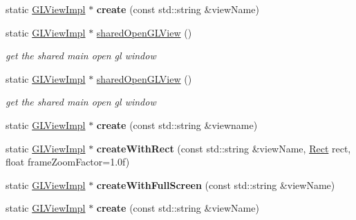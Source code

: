 \begin{DoxyCompactItemize}
static \hyperlink{classGLViewImpl}{G\+L\+View\+Impl} $\ast$ {\bfseries create} (const std\+::string \&view\+Name)
\item 
\mbox{\label{classGLViewImpl_aeb7c469b5f69781f95939b463eb1a0a3}} 
static \hyperlink{classGLViewImpl}{G\+L\+View\+Impl} $\ast$ \hyperlink{classGLViewImpl_aeb7c469b5f69781f95939b463eb1a0a3}{shared\+Open\+G\+L\+View} ()
\begin{DoxyCompactList}\small\item\em get the shared main open gl window \end{DoxyCompactList}\item 
\mbox{\label{classGLViewImpl_ad1848aec8bd128fe100241199df65e3d}} 
static \hyperlink{classGLViewImpl}{G\+L\+View\+Impl} $\ast$ \hyperlink{classGLViewImpl_ad1848aec8bd128fe100241199df65e3d}{shared\+Open\+G\+L\+View} ()
\begin{DoxyCompactList}\small\item\em get the shared main open gl window \end{DoxyCompactList}\item 
\mbox{\label{classGLViewImpl_aec0a6a65ba1e2eccc4151d949c9e4157}} 
static \hyperlink{classGLViewImpl}{G\+L\+View\+Impl} $\ast$ {\bfseries create} (const std\+::string \&viewname)
\item 
\mbox{\label{classGLViewImpl_a4698aaca4ca46c308859c7b731bf5cc1}} 
static \hyperlink{classGLViewImpl}{G\+L\+View\+Impl} $\ast$ {\bfseries create\+With\+Rect} (const std\+::string \&view\+Name, \hyperlink{classRect}{Rect} rect, float frame\+Zoom\+Factor=1.\+0f)
\item 
\mbox{\label{classGLViewImpl_aca84dd242aa41c37bb47a196c2a8870b}} 
static \hyperlink{classGLViewImpl}{G\+L\+View\+Impl} $\ast$ {\bfseries create\+With\+Full\+Screen} (const std\+::string \&view\+Name)
\item 
\mbox{\label{classGLViewImpl_a6e699d7e719e91833b93dcfffca4d081}} 
static \hyperlink{classGLViewImpl}{G\+L\+View\+Impl} $\ast$ {\bfseries create} (const std\+::string \&view\+Name)
\item 
\mbox{\label{classGLViewImpl_abf138c0baa72cd8801888064c4f2c10d}} 

\end{DoxyCompactItemize}
